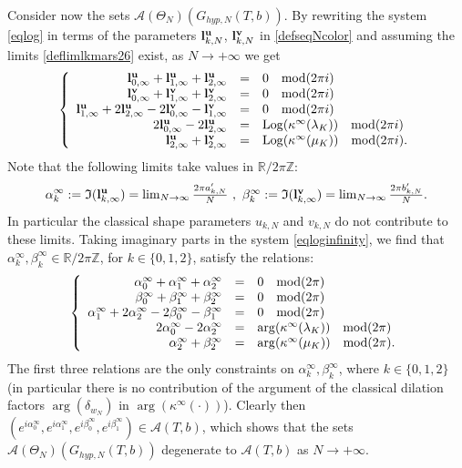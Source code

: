 \documentclass[11pt]{amsart}
\newcommand{\mr}{\mathbb{R}}
\newcommand{\mz}{\mathbb{Z}}
\newcommand{\bu}{{\bf u}}
\newcommand{\bv}{{\bf v}}
\newcommand{\bl}{{\bf l}}
\newcommand{\Log}{{\rm Log}}
\newcommand{\ra}{\rightarrow}
\begin{document}
{Consider now the sets $\mathcal{A}(\Theta_N)(G_{hyp,N}(T,b))$. By rewriting the system \eqref{eqlog} in terms of the parameters $\bl_{k,N}^\bu$, $\bl_{k,N}^\bv$ in \eqref{defseqNcolor} and assuming the limits \eqref{deflimlkmars26} exist, as $N\rightarrow +\infty$ we get
\begin{equation}\label{eqloginfinity}
\left\lbrace\begin{array}{rcl}
\bl_{0,\infty}^{\bu}+\bl_{1,\infty}^{\bu}+\bl_{2,\infty}^{\bu} & = &0 \quad {\rm mod}(2\pi i)\\
\bl_{0,\infty}^{\bv}+\bl_{1,\infty}^{\bv}+\bl_{2,\infty}^{\bv} & = & 0 \quad {\rm mod}(2\pi i)\\
\bl_{1,\infty}^{\bu}+2\bl_{2,\infty}^{\bu}-2\bl_{0,\infty}^{\bv}-\bl_{1,\infty}^{\bv} & = & 0 \quad {\rm mod}(2\pi i)\\
2\bl_{0,\infty}^{\bu}-2\bl_{2,\infty}^{\bu}& = &\Log(\kappa^\infty(\lambda_K))  \quad {\rm mod}(2\pi i)\\
\bl_{2,\infty}^{\bu}+\bl_{2,\infty}^{\bv} & = & \Log(\kappa^\infty(\mu_K))  \quad {\rm mod}(2\pi i).
\end{array}\right.
\end{equation}
Note that the following limits take values in $\mr/2\pi\mz$:
$$\alpha_k^\infty := \mathfrak{I}(\bl_{k,\infty}^{\bu}) =  \textstyle \lim_{N\rightarrow \infty} \frac{2\pi a_{k,N}'}{N}\ ,\ \beta_k^\infty := \mathfrak{I}(\bl_{k,\infty}^{\bv}) =  \textstyle \lim_{N\rightarrow \infty} \frac{2\pi b_{k,N}'}{N}.$$ In particular the classical shape parameters $u_{k,N}$ and $v_{k,N}$ do not contribute to these limits. Taking imaginary parts in the system \eqref{eqloginfinity}, we find that $\alpha_k^\infty, \beta_k^\infty\in \mr/2\pi \mz$, for $k\in \{0,1,2\}$, satisfy the relations:
\begin{equation}\label{eqarginfinity}
\left\lbrace\begin{array}{rcl}
\alpha_0^\infty+\alpha_1^\infty+\alpha_2^\infty & = &0 \quad {\rm mod}(2\pi )\\
\beta_0^\infty+\beta_1^\infty+\beta_2^\infty & = & 0 \quad {\rm mod}(2\pi )\\
\alpha_1^\infty+2\alpha_2^\infty-2\beta_0^\infty-\beta_1^\infty & = & 0 \quad {\rm mod}(2\pi )\\
2\alpha_0^\infty-2\alpha_2^\infty & = &\arg(\kappa^\infty(\lambda_K))  \quad {\rm mod}(2\pi )\\
\alpha_2^\infty+\beta_2^\infty & = & \arg(\kappa^\infty(\mu_K))  \quad {\rm mod}(2\pi ).
\end{array}\right.
\end{equation}
The first three relations are the only constraints on $\alpha_k^\infty, \beta_k^\infty$, where $k\in \{0,1,2\}$ (in particular there is no contribution of the argument of the classical dilation factors $\arg(\delta_{w_N})$ in $\arg(\kappa^\infty(\cdot))$). Clearly then $(e^{i\alpha_0^\infty}, e^{i\alpha_1^\infty},e^{i\beta_0^\infty},e^{i\beta_1^\infty})\in \mathcal{A}(T,b)$, which shows that the sets $\mathcal{A}(\Theta_N)(G_{hyp,N}(T,b))$ degenerate to $\mathcal{A}(T,b)$ as $N\ra+\infty$.\endproof
\medskip

}
\end{document}

